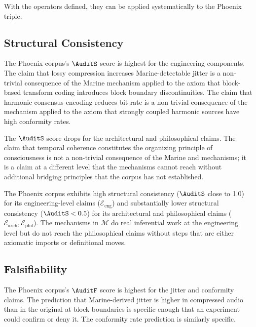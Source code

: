 With the operators defined, they can be applied
systematically to the Phoenix triple.

\subsection{Structural Consistency}

The Phoenix corpus's $\AuditS$ score is highest for
the engineering components. The claim that lossy
compression increases Marine-detectable jitter is
a non-trivial consequence of the Marine mechanism
applied to the axiom that block-based transform
coding introduces block boundary discontinuities.
The claim that harmonic consensus encoding reduces
bit rate is a non-trivial consequence of the \HCFone{}
mechanism applied to the axiom that strongly coupled
harmonic sources have high conformity rates.

The $\AuditS$ score drops for the architectural and
philosophical claims. The claim that temporal coherence
constitutes the organizing principle of consciousness
is not a non-trivial consequence of the Marine and
\MEMeight{} mechanisms; it is a claim at a different
level that the mechanisms cannot reach without
additional bridging principles that the corpus has
not established.

\begin{auditprop}
\label{ap:structural-consistency-result}
The Phoenix corpus exhibits high structural consistency
($\AuditS$ close to 1.0) for its engineering-level
claims ($\mathcal{E}_{\mathrm{eng}}$) and substantially
lower structural consistency ($\AuditS < 0.5$) for
its architectural and philosophical claims
($\mathcal{E}_{\mathrm{arch}}, \mathcal{E}_{\mathrm{phil}}$).
The mechanisms in $\mathcal{M}$ do real inferential
work at the engineering level but do not reach the
philosophical claims without steps that are either
axiomatic imports or definitional moves.
\end{auditprop}

\subsection{Falsifiability}

The Phoenix corpus's $\AuditF$ score is highest for
the jitter and conformity claims. The prediction that
Marine-derived jitter is higher in compressed audio
than in the original at block boundaries is specific
enough that an experiment could confirm or deny it.
The conformity rate prediction is similarly specific.

